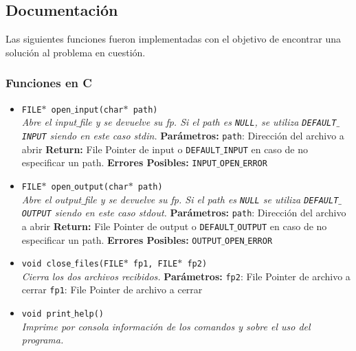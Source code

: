 \documentclass[a4paper, 10pt]{article}
\def\code#1{\texttt{#1}}
\begin{document}
		\subsection{Documentación}
			Las siguientes funciones fueron implementadas con el objetivo de encontrar una solución al problema
			en cuestión.

			\subsubsection{Funciones en C}	
			\begin{itemize}

				\item \code{FILE$*$ open$\_$input(char$*$ path)}
				\\\textit{Abre el input$\_$file y se devuelve su fp.
				Si el path es \code{NULL},
				se utiliza \code{DEFAULT$\_$INPUT} siendo en este caso stdin.}
					\subitem \textbf{Parámetros:}
						\subsubitem \code{path}: Dirección del archivo a abrir
					\subitem \textbf{Return:}
						\subsubitem File Pointer de input o \code{DEFAULT$\_$INPUT}
						en caso de no especificar un path.
					\subitem \textbf{Errores Posibles:}
						\subsubitem \code{INPUT$\_$OPEN$\_$ERROR}

				\item \code{FILE$*$ open$\_$output(char$*$ path)}
				\\\textit{Abre el output$\_$file y se devuelve su fp. Si el path es \code{NULL}
				se utiliza \code{DEFAULT$\_$OUTPUT} siendo en este caso stdout.}
					\subitem \textbf{Parámetros:}
						\subsubitem \code{path}: Dirección del archivo a abrir
					\subitem \textbf{Return:}
						\subsubitem File Pointer de output o \code{DEFAULT$\_$OUTPUT} en caso de
						no especificar un path.
					\subitem \textbf{Errores Posibles:}
						\subsubitem \code{OUTPUT$\_$OPEN$\_$ERROR}

				\item \code{void close$\_$files(FILE$*$ fp1, FILE$*$ fp2)}
				\\\textit{Cierra los dos archivos recibidos.}
					\subitem \textbf{Parámetros:}
						\subsubitem \code{fp2}: File Pointer de archivo a cerrar
						\subsubitem \code{fp1}: File Pointer de archivo a cerrar

				\item \code{void print$\_$help()}
				\\\textit{Imprime por consola información de los comandos y sobre el
				uso del programa.}


\end{itemize}
\end{document}
